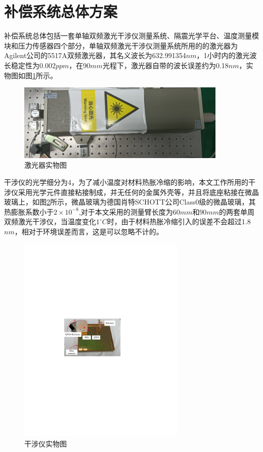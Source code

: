 \section{补偿系统总体方案}
补偿系统总体包括一套单轴双频激光干涉仪测量系统、隔震光学平台、温度测量模块和压力传感器四个部分，单轴双频激光干涉仪测量系统所用的的激光器为Agilent公司的5517A双频激光器，其名义波长为632.991354$nm$，1小时内的激光波长稳定性为0.002$ppm$，在90$mm$光程下，激光器自带的波长误差约为0.18$nm$，实物图如图\ref{fig:激光器实物图}所示。
\begin{figure}[htb]
    \centering
    \includegraphics[width=10cm]{fig/3-fig/激光器实物图.png}
    \caption{激光器实物图}
    \label{fig:激光器实物图}
\end{figure}

干涉仪的光学细分为4，为了减小温度对材料热胀冷缩的影响，本文工作所用的干涉仪采用光学元件直接粘接制成，并无任何的金属外壳等，并且将底座粘接在微晶玻璃上，如图\ref{fig:干涉仪实物图}所示，微晶玻璃为德国肖特SCHOTT公司Class0级的微晶玻璃，其热膨胀系数小于$2\times 10^{-8}$,对于本文采用的测量臂长度为60$mm$和90$mm$的两套单周双频激光干涉仪，当温度变化$1^{ \circ}C$时，由于材料热胀冷缩引入的误差不会超过1.8$nm$，相对于环境误差而言，这是可以忽略不计的。
\begin{figure}[htb]
    \centering
    \includegraphics[width=8cm]{fig/3-fig/干涉仪实物图.pdf}
    \caption{干涉仪实物图}
    \label{fig:干涉仪实物图}
\end{figure}


